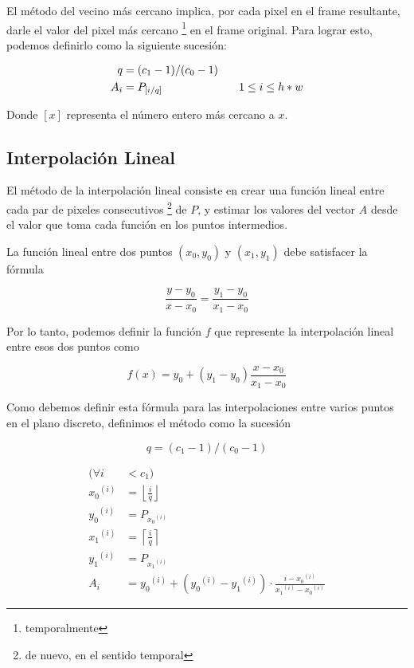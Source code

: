El m\'etodo del vecino m\'as cercano implica, por cada pixel en el frame
resultante, darle el valor del pixel m\'as cercano \footnote{temporalmente} en
el frame original. Para lograr esto, podemos definirlo como la siguiente
sucesi\'on:

\[
\begin{split}
q & = (c_1 - 1) / (c_0 - 1) \\
A_i & = P_{\left[i / q \right]} \hspace{.2\textwidth} 1 \leq i \leq h*w
\end{split}
\]

Donde $\left[x\right]$ representa el n\'umero entero m\'as cercano a $x$.

\subsection{Interpolaci\'on Lineal}

El m\'etodo de la interpolaci\'on lineal consiste en crear una funci\'on lineal
entre cada par de pixeles consecutivos \footnote{de nuevo, en el sentido
temporal} de $P$, y estimar los valores del vector $A$ desde el valor que toma
cada funci\'on en los puntos intermedios.

La funci\'on lineal entre dos puntos $\left(x_0, y_0\right)$ y $\left(x_1,
y_1\right)$ debe satisfacer la f\'ormula

\[
\frac{y - y_0}{x - x_0} = \frac{y_1 - y_0}{x_1 - x_0}
\]

Por lo tanto, podemos definir la funci\'on $f$ que represente la interpolaci\'on
lineal entre esos dos puntos como

\[
f(x) = y_0 + (y_1 - y_0) \frac{x - x_0}{x_1 - x_0}
\]

Como debemos definir esta f\'ormula para las interpolaciones entre varios puntos en
el plano discreto, definimos el m\'etodo como la sucesi\'on

\[
q = (c_1 - 1) / (c_0 - 1)
\]

\[
\begin{split}
(\forall i & < c_1) \\
{x_0}^{(i)} & = \left\lfloor \frac{i}{q} \right\rfloor \\
{y_0}^{(i)} & = P_{{x_0}^{(i)}} \\
{x_1}^{(i)} & = \left\lceil \frac{i}{q} \right\rceil \\
{y_1}^{(i)} & = P_{{x_1}^{(i)}} \\
A_i & = {y_0}^{(i)} + ({y_0}^{(i)} - {y_1}^{(i)}) \cdot \frac{i - {x_0}^{(i)}}{{x_1}^{(i)} - {x_0}^{(i)}}
\end{split}
\]

